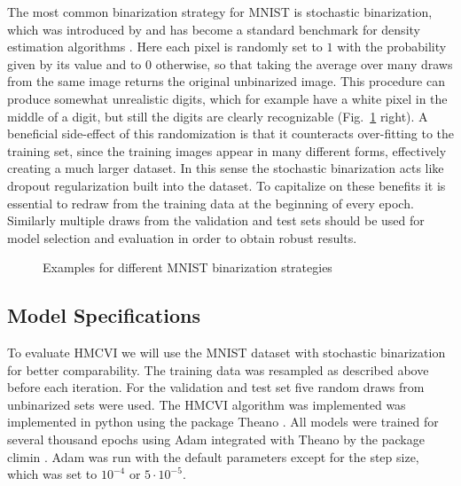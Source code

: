 \documentclass[12pt]{scrartcl}
\begin{document}
The most common binarization strategy for MNIST is stochastic binarization, which was introduced by \citep{Salakhutdinov2008} and has become a standard benchmark for density estimation algorithms \citep{Salimans2014,Rezende2014}. Here each pixel is randomly set to $1$ with the probability given by its value and to $0$ otherwise, so that taking the average over many draws from the same image returns the original unbinarized image. This procedure can produce somewhat unrealistic digits, which for example have a white pixel in the middle of a digit, but still the digits are clearly recognizable (Fig.~\ref{fig:MNISTBinarizationComparison} right). A beneficial side-effect of this randomization is that it counteracts over-fitting to the training set, since the training images appear in many different forms, effectively creating a much larger dataset. In this sense the stochastic binarization acts like dropout regularization \citep{Hinton2012} built into the dataset. To capitalize on these benefits it is essential to redraw from the training data at the beginning of every epoch. Similarly multiple draws from the validation and test sets should be used for model selection and evaluation in order to obtain robust results. 

\begin{figure}
\centering
\caption{Examples for different MNIST binarization strategies}
\label{fig:MNISTBinarizationComparison}
\end{figure}

\subsection{Model Specifications}
\label{sec:ModelSpecifications}
To evaluate HMCVI we will use the MNIST dataset with stochastic binarization for better comparability. The training data was resampled as described above before each iteration. For the validation and test set five random draws from unbinarized sets were used. The HMCVI algorithm was implemented was implemented in python using the package Theano \citep{Bergstra2010, Bastien2012}. All models were trained for several thousand epochs using Adam \citep{Kingma2015} integrated with Theano by the package climin \citep{Bayer2015}. Adam was run with the default parameters except for the step size, which was set to $10^{-4}$ or $5 \cdot 10^{-5}$.
\end{document}

